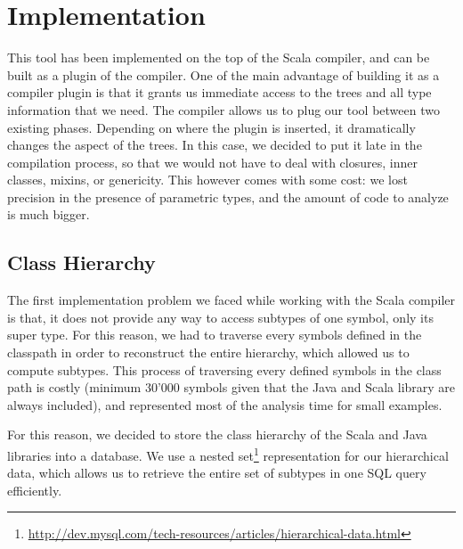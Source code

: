 \chapter{Implementation}
\label{chap:implementation}
This tool has been implemented on the top of the Scala compiler, and can be
built as a plugin of the compiler. One of the main advantage of building it as
a compiler plugin is that it grants us immediate access to the trees and all
type information that we need. The compiler allows us to plug our tool between
two existing phases. Depending on where the plugin is inserted, it dramatically
changes the aspect of the trees. In this case, we decided to put it late in the
compilation process, so that we would not have to deal with closures, inner
classes, mixins, or genericity. This however comes with some cost: we lost
precision in the presence of parametric types, and the amount of code to
analyze is much bigger.

\section{Class Hierarchy}
The first implementation problem we faced while working with the Scala compiler
is that, it does not provide any way to access subtypes of one symbol, only its
super type. For this reason, we had to traverse every symbols defined in the
classpath in order to reconstruct the entire hierarchy, which allowed us to
compute subtypes. This process of traversing every defined symbols in the class
path is costly (minimum 30'000 symbols given that the Java and Scala library are always
included), and represented most of the analysis time for small examples.

For this reason, we decided to store the class hierarchy of the Scala and Java
libraries into a database. We use a nested
set\footnote{\url{http://dev.mysql.com/tech-resources/articles/hierarchical-data.html}}
representation for our hierarchical data, which allows us to retrieve the entire
set of subtypes in one SQL query efficiently.
